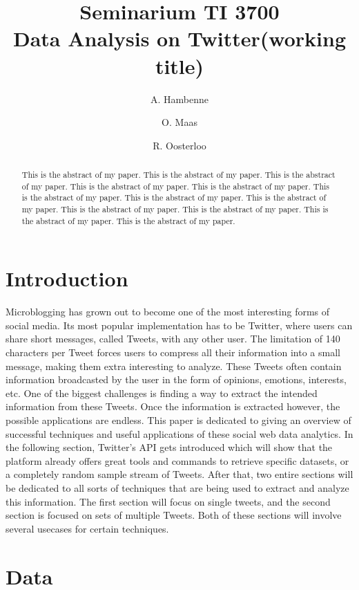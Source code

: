 \documentclass{article}
\title{Seminarium TI 3700\\ Data Analysis on Twitter(working title)}
\author{A. Hambenne  \and
    O. Maas \and
    R. Oosterloo}
\date{}
\begin{document}
\maketitle
\thispagestyle{empty}

\begin{abstract}
This is the abstract of my paper.
This is the abstract of my paper.
This is the abstract of my paper.
This is the abstract of my paper.
This is the abstract of my paper.
This is the abstract of my paper.
This is the abstract of my paper.
This is the abstract of my paper.
This is the abstract of my paper.
This is the abstract of my paper.
This is the abstract of my paper.
This is the abstract of my paper.
\end{abstract}


\section{Introduction}

Microblogging has grown out to become one of the most interesting forms of social media. Its most popular implementation has to be Twitter, where users can share short messages, called Tweets, with any other user. The limitation of 140 characters per Tweet forces users to compress all their information into a small message, making them extra interesting to analyze. These Tweets often contain information broadcasted by the user in the form of opinions, emotions, interests, etc. One of the biggest challenges is finding a way to extract the intended information from these Tweets. Once the information is extracted however, the possible applications are endless. This paper is dedicated to giving an overview of successful techniques and useful applications of these social web data analytics. In the following section, Twitter's API gets introduced which will show that the platform already offers great tools and commands to retrieve specific datasets, or a completely random sample stream of Tweets. After that, 
two entire sections will be dedicated to all sorts of techniques that are being used to extract and analyze this information. The first section will focus on single tweets, and the second section is focused on sets of multiple Tweets. Both of these sections will involve several usecases for certain techniques.



\section{Data}
\end{document}

